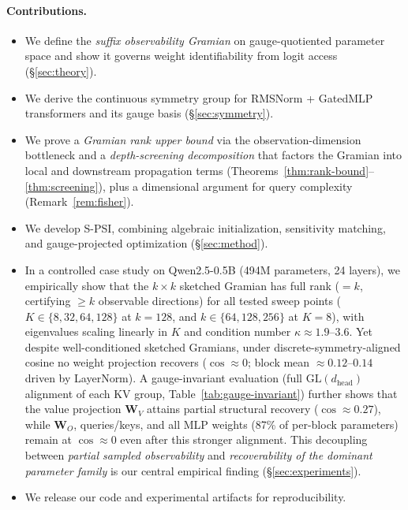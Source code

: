 \documentclass{article}
\newcommand{\bW}{\mathbf{W}}
\begin{document}
\paragraph{Contributions.}
\begin{itemize}
    \item We define the \emph{suffix observability Gramian} on gauge-quotiented parameter space and show it governs weight identifiability from logit access (\S\ref{sec:theory}).
    \item We derive the continuous symmetry group for RMSNorm + GatedMLP transformers and its gauge basis (\S\ref{sec:symmetry}).
    \item We prove a \emph{Gramian rank upper bound} via the observation-dimension bottleneck and a \emph{depth-screening decomposition} that factors the Gramian into local and downstream propagation terms (Theorems~\ref{thm:rank-bound}--\ref{thm:screening}), plus a dimensional argument for query complexity (Remark~\ref{rem:fisher}).
    \item We develop S-PSI, combining algebraic initialization, sensitivity matching, and gauge-projected optimization (\S\ref{sec:method}).
    \item In a controlled case study on Qwen2.5-0.5B (494M parameters, 24 layers), we empirically show that the $k \times k$ sketched Gramian has full rank ($= k$, certifying $\geq k$ observable directions) for all tested sweep points ($K \in \{8, 32, 64, 128\}$ at $k{=}128$, and $k \in \{64, 128, 256\}$ at $K{=}8$), with eigenvalues scaling linearly in $K$ and condition number $\kappa \approx 1.9$--$3.6$.  Yet despite well-conditioned sketched Gramians, under discrete-symmetry-aligned cosine no weight projection recovers ($\cos \approx 0$; block mean $\approx 0.12$--$0.14$ driven by LayerNorm).  A gauge-invariant evaluation (full $\mathrm{GL}(d_\text{head})$ alignment of each KV group, Table~\ref{tab:gauge-invariant}) further shows that the value projection $\bW_V$ attains partial structural recovery ($\cos \approx 0.27$), while $\bW_O$, queries/keys, and all MLP weights (87\% of per-block parameters) remain at $\cos \approx 0$ even after this stronger alignment.  This decoupling between \emph{partial sampled observability} and \emph{recoverability of the dominant parameter family} is our central empirical finding (\S\ref{sec:experiments}).
    \item We release our code and experimental artifacts for reproducibility.
\end{itemize}
\end{document}
